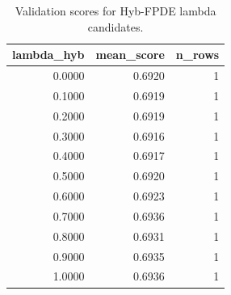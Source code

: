 \begin{table}[t]
\caption{Validation scores for Hyb-FPDE lambda candidates.}
\label{tab:lambda_distribution_computed}
\centering
\begin{tabular}{rrr}
\toprule
lambda\_hyb & mean\_score & n\_rows \\
\midrule
0.0000 & 0.6920 & 1 \\
0.1000 & 0.6919 & 1 \\
0.2000 & 0.6919 & 1 \\
0.3000 & 0.6916 & 1 \\
0.4000 & 0.6917 & 1 \\
0.5000 & 0.6920 & 1 \\
0.6000 & 0.6923 & 1 \\
0.7000 & 0.6936 & 1 \\
0.8000 & 0.6931 & 1 \\
0.9000 & 0.6935 & 1 \\
1.0000 & 0.6936 & 1 \\
\bottomrule
\end{tabular}

\end{table}
